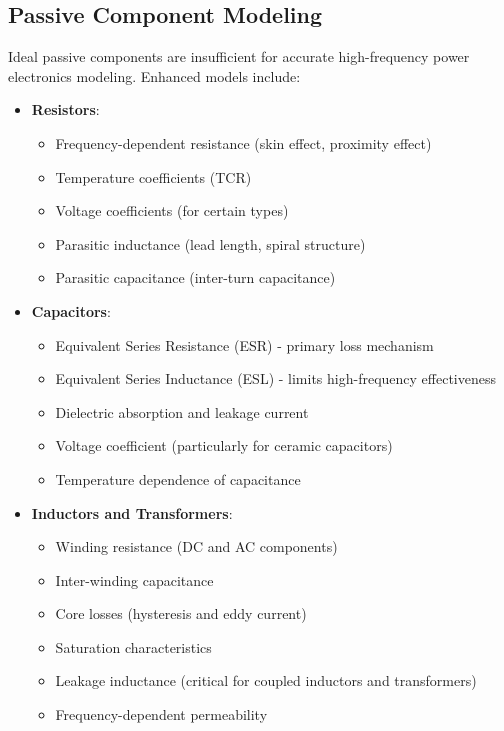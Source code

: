 \subsection{Passive Component Modeling}
Ideal passive components are insufficient for accurate high-frequency power electronics modeling. Enhanced models include:
\begin{itemize}
    \item \textbf{Resistors}:
    \begin{itemize}
        \item Frequency-dependent resistance (skin effect, proximity effect)
        \item Temperature coefficients (TCR)
        \item Voltage coefficients (for certain types)
        \item Parasitic inductance (lead length, spiral structure)
        \item Parasitic capacitance (inter-turn capacitance)
    \end{itemize}
    \item \textbf{Capacitors}:
    \begin{itemize}
        \item Equivalent Series Resistance (ESR) - primary loss mechanism
        \item Equivalent Series Inductance (ESL) - limits high-frequency effectiveness
        \item Dielectric absorption and leakage current
        \item Voltage coefficient (particularly for ceramic capacitors)
        \item Temperature dependence of capacitance
    \end{itemize}
    \item \textbf{Inductors and Transformers}:
    \begin{itemize}
        \item Winding resistance (DC and AC components)
        \item Inter-winding capacitance
        \item Core losses (hysteresis and eddy current)
        \item Saturation characteristics
        \item Leakage inductance (critical for coupled inductors and transformers)
        \item Frequency-dependent permeability
    \end{itemize}
\end{itemize}


